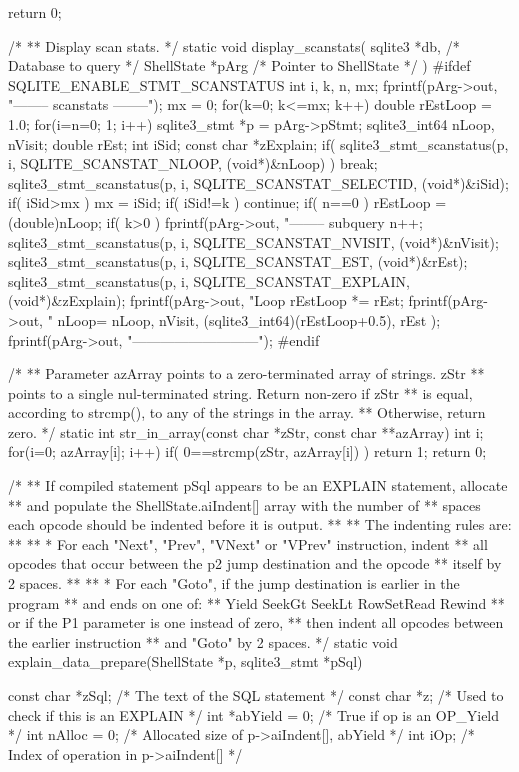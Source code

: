 \begin{Codex}[label=shell.c,numbers=left]
{{  return 0;
}

/*
** Display scan stats.
*/
static void display_scanstats(
  sqlite3 *db,                    /* Database to query */
  ShellState *pArg                /* Pointer to ShellState */
){
#ifdef SQLITE_ENABLE_STMT_SCANSTATUS
  int i, k, n, mx;
  fprintf(pArg->out, "-------- scanstats --------\n");
  mx = 0;
  for(k=0; k<=mx; k++){
    double rEstLoop = 1.0;
    for(i=n=0; 1; i++){
      sqlite3_stmt *p = pArg->pStmt;
      sqlite3_int64 nLoop, nVisit;
      double rEst;
      int iSid;
      const char *zExplain;
      if( sqlite3_stmt_scanstatus(p, i, SQLITE_SCANSTAT_NLOOP, (void*)&nLoop) ){
        break;
      }
      sqlite3_stmt_scanstatus(p, i, SQLITE_SCANSTAT_SELECTID, (void*)&iSid);
      if( iSid>mx ) mx = iSid;
      if( iSid!=k ) continue;
      if( n==0 ){
        rEstLoop = (double)nLoop;
        if( k>0 ) fprintf(pArg->out, "-------- subquery %
      }
      n++;
      sqlite3_stmt_scanstatus(p, i, SQLITE_SCANSTAT_NVISIT, (void*)&nVisit);
      sqlite3_stmt_scanstatus(p, i, SQLITE_SCANSTAT_EST, (void*)&rEst);
      sqlite3_stmt_scanstatus(p, i, SQLITE_SCANSTAT_EXPLAIN, (void*)&zExplain);
      fprintf(pArg->out, "Loop %
      rEstLoop *= rEst;
      fprintf(pArg->out, 
          "         nLoop=%
          nLoop, nVisit, (sqlite3_int64)(rEstLoop+0.5), rEst
      );
    }
  }
  fprintf(pArg->out, "---------------------------\n");
#endif
}

/*
** Parameter azArray points to a zero-terminated array of strings. zStr
** points to a single nul-terminated string. Return non-zero if zStr
** is equal, according to strcmp(), to any of the strings in the array.
** Otherwise, return zero.
*/
static int str_in_array(const char *zStr, const char **azArray){
  int i;
  for(i=0; azArray[i]; i++){
    if( 0==strcmp(zStr, azArray[i]) ) return 1;
  }
  return 0;
}

/*
** If compiled statement pSql appears to be an EXPLAIN statement, allocate
** and populate the ShellState.aiIndent[] array with the number of
** spaces each opcode should be indented before it is output. 
**
** The indenting rules are:
**
**     * For each "Next", "Prev", "VNext" or "VPrev" instruction, indent
**       all opcodes that occur between the p2 jump destination and the opcode
**       itself by 2 spaces.
**
**     * For each "Goto", if the jump destination is earlier in the program
**       and ends on one of:
**          Yield  SeekGt  SeekLt  RowSetRead  Rewind
**       or if the P1 parameter is one instead of zero,
**       then indent all opcodes between the earlier instruction
**       and "Goto" by 2 spaces.
*/
static void explain_data_prepare(ShellState *p, sqlite3_stmt *pSql){
  const char *zSql;               /* The text of the SQL statement */
  const char *z;                  /* Used to check if this is an EXPLAIN */
  int *abYield = 0;               /* True if op is an OP_Yield */
  int nAlloc = 0;                 /* Allocated size of p->aiIndent[], abYield */
  int iOp;                        /* Index of operation in p->aiIndent[] */

}}
\end{Codex}
